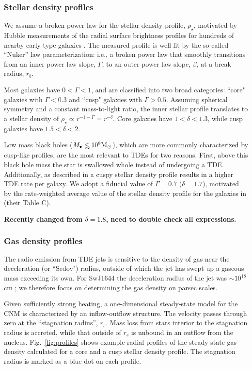 \documentclass[usenatbib,fleqn]{mnras}
\newcommand\lsim{\mathrel{\rlap{\lower4pt\hbox{\hskip1pt$\sim$}}
    \raise1pt\hbox{$<$}}}
\newcommand{\Mbh}[1][]{M_{\bullet#1}}
\newcommand{\Msun}{{\rm M_\odot}}
\newcommand{\rs}{r_s}
\begin{document}
\subsubsection{Stellar density profiles}
We assume a broken power law for the stellar density profile, $\rho_{\star}$,  motivated by Hubble measurements of the radial surface brightness profiles for hundreds of nearby early type galaxies \citep{Lauer+2007}.  The measured profile is well fit by the so-called ``Nuker'' law parameterization:
i.e., a broken power law that smoothly transitions from an inner power law
slope, $\Gamma$, to an outer power law slope, $\beta$, at a break
radius, $r_b$.

Most galaxies have $0<\Gamma<1$, and are classified into two broad
categories: ``core" galaxies with $\Gamma<0.3$ and ``cusp" galaxies with
$\Gamma>0.5$. Assuming spherical symmetry and a constant mass-to-light
ratio, the inner stellar profile translates to a stellar density of
$\rho_\star\propto r^{-1-\Gamma}=r^{-\delta}$. Core galaxies have
$1<\delta<1.3$, while cusp galaxies have $1.5<\delta<2$.

Low mass black holes ($\Mbh\lsim 10^{8} \Msun$), which are more commonly characterized by cusp-like profiles, are the most relevant to TDEs for two reasons.  First, above this black hole mass the star is swallowed whole instead of undergoing a TDE.  Additionally, as described in \citet{Stone&Metzger2016} 
a cuspy stellar density profile results in a higher TDE rate per galaxy.  We adopt a fiducial value of $\Gamma=0.7$ ($\delta=1.7$), motivated by the rate-weighted average value of the stellar density profile for the galaxies in \citet{Stone&Metzger2016} (their Table C).

 {\bf Recently changed from $\delta=1.8$, need to
  double check all expressions.}

\subsubsection{Gas density profiles}
The radio emission from TDE jets is sensitive to the density of gas near the deceleration (or ``Sedov") radius, outside of which the jet has swept up a gaseous mass exceeding its own.  For SwJ1644 the deceleration
radius of the jet was $\sim 10^{18}$ cm \citep{Mimica+2015}; we therefore focus on determining the gas density on parsec scales.

Given sufficiently strong heating, a one-dimensional steady-state model for the CNM is characterized by an inflow-outflow structure.  The velocity passes through zero at the ``stagnation radius'', $\rs$.  Mass loss from stars interior to the stagnation radius is accreted, while that outside of $\rs$ is unbound in an outflow from the nucleus.  Fig.~\ref{fig:profiles} shows example radial profiles of the steady-state gas density calculated for a core and a cusp stellar density profile. The stagnation radius is marked as a blue dot on each profile.
\end{document}
